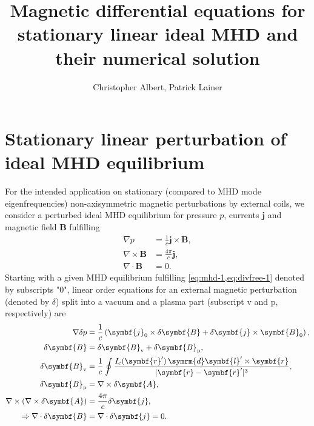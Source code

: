 \documentclass[a4paper, 10pt, english]{article}
\title{Magnetic differential equations for stationary linear ideal MHD and their numerical solution}
\author{Christopher Albert, Patrick Lainer}
\let\vec\symbf
\newcommand*\diff{\ensuremath{\symrm{d}}}
\begin{document}
\maketitle
\tableofcontents

\section{Stationary linear perturbation of ideal MHD equilibrium}

For the intended application on stationary (compared to MHD mode eigenfrequencies) non-axisymmetric magnetic perturbations by external coils, we consider a perturbed ideal MHD equilibrium for pressure $p$, currents $\vec{j}$ and magnetic field $\vec{B}$ fulfilling
\begin{align}
  \nabla p &= \frac{1}{c} \vec{j} \times \vec{B}, \label{eq:mhd-1} \\
  \nabla \times \vec{B} &= \frac{4 \pi}{c} \vec{j}, \label{eq:ampere-1} \\
  \nabla \cdot \vec{B} &= 0. \label{eq:divfree-1}
\end{align}
Starting with a given MHD equilibrium fulfilling \cref{eq:mhd-1,eq:divfree-1} denoted by subscripts "$0$", linear order equations for an external magnetic perturbation (denoted by $\delta$) split into a vacuum and a plasma part (subscript $\text{v}$ and $\text{p}$, respectively) are
\begin{align}
  \nabla \delta p &= \frac{1}{c} \left( \vec{j}_{0} \times \delta \vec{B} + \delta \vec{j} \times \vec{B}_{0} \right), \label{eq:mhd} \\
  \delta \vec{B} &= \delta \vec{B}_{\text{v}} + \delta \vec{B}_{\text{p}}, \label{eq:vecpot} \\
  \delta \vec{B}_{\text{v}} &= \frac{1}{c} \oint \frac{I_{\text{c}}(\vec{r}') \, \diff \vec{l}' \times \vec{r}}{\lvert \vec{r} - \vec{r}' \rvert^{3}}, \\
  \delta \vec{B}_{\text{p}} &= \nabla \times \delta \vec{A}, \\
  \nabla \times (\nabla \times \delta \vec{A}) &= \frac{4 \pi}{c} \delta \vec{j}, \label{eq:ampere} \\
  \Rightarrow \nabla \cdot \delta \vec{B} &= \nabla \cdot \delta \vec{j} = 0. \label{eq:divfree}
\end{align}
\end{document}
